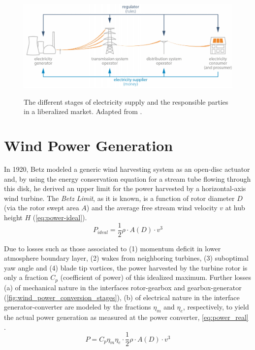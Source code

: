 \begin{figure}[H]%
	\centering
    \caption{The different stages of electricity supply and the responsible parties in a liberalized market. Adapted from \cite{erbach2016market}.}
    \includegraphics[scale=0.35]{electricity_grid_players.png}
	\label{fig:electricity_grid_players}
\end{figure}

\section{Wind Power Generation}

In 1920, Betz \cite{betz1920limit} modeled a generic wind harvesting system as an open-disc actuator and, by using the energy conservation equation for a stream tube flowing through this disk, he derived an upper limit for the power harvested by a horizontal-axis wind turbine. The \textit{Betz Limit}, as it is known, is a function of rotor diameter $D$ (via the rotor swept area $A$) and the average free stream wind velocity $v$ at hub height $H$ (\ref{eq:power-ideal}).
\begin{equation}\label{eq:power-ideal}
P_{ideal} = \frac{1}{2}\rho \cdot A(D)\cdot v^3
\end{equation}

Due to losses such as those associated to (1) momentum deficit in lower atmosphere boundary layer, (2) wakes from neighboring turbines, (3) suboptimal yaw angle and (4) blade tip vortices, the power harvested by the turbine rotor is only a fraction $C_p$ (coefficient of power) of this idealized maximum. Further  losses (a) of mechanical nature in the interfaces rotor-gearbox and gearbox-generator (\ref{fig:wind_power_conversion_stages}), (b) of electrical nature in the interface generator-converter  are modeled by the fractions $\eta_{m}$ and $\eta_{e}$, respectively,  to yield the actual power generation as measured at the power converter, \ref{eq:power_real} \cite{albadi2009capacity}.
\begin{equation}\label{eq:power_real}
P = C_p\eta_{m} \eta_{e}  \cdot \frac{1}{2}\rho \cdot A(D)\cdot v^3
\end{equation}

